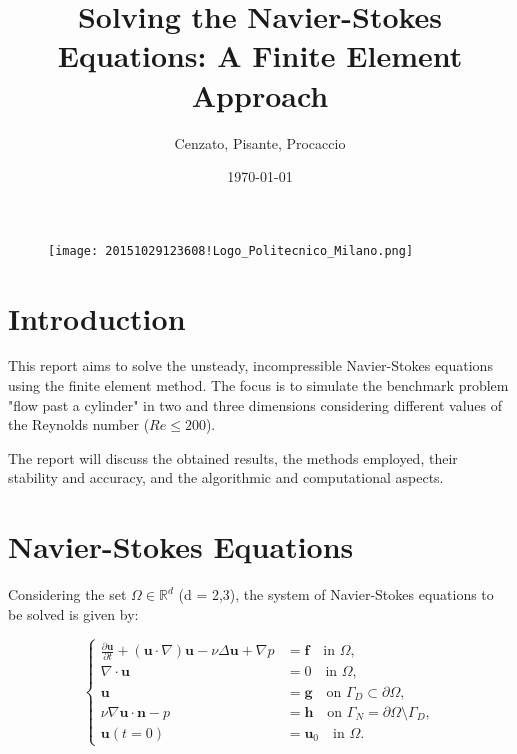 \documentclass{article}
\title{Solving the Navier-Stokes Equations: A Finite Element Approach}
\author{Cenzato, Pisante, Procaccio}
\date{\today}
\begin{document}
\maketitle

\begin{figure}
    \centering
    \texttt{[image: 20151029123608!Logo\_Politecnico\_Milano.png]}
    \label{fig:enter-label}
\end{figure}



\newpage
\tableofcontents


\section*{Introduction}

This report aims to solve the unsteady, incompressible Navier-Stokes equations using the finite element method. The focus is to simulate the benchmark problem "flow past a cylinder" in two and three dimensions considering different values of the Reynolds number (\(Re \leq 200\)).



The report will discuss the obtained results, the methods employed, their stability and accuracy, and the algorithmic and computational aspects.

\section*{Navier-Stokes Equations}

Considering the set $\Omega \in \mathbb{R}^d$ (d = 2,3), the system of Navier-Stokes equations to be solved is given by:

\begin{equation}
\begin{cases}
\frac{\partial \mathbf{u}}{\partial t} + (\mathbf{u} \cdot \nabla)\mathbf{u} - \nu \Delta \mathbf{u} + \nabla p &= \mathbf{f} \quad \text{in } \Omega , \\
\nabla \cdot \mathbf{u} &= 0 \quad \text{in } \Omega, \\
\mathbf{u} &= \mathbf{g} \quad \text{on } \Gamma_D \subset \partial \Omega, \\
\nu \nabla \mathbf{u} \cdot \mathbf{n} - p &= \mathbf{h} \quad \text{on } \Gamma_N = \partial \Omega \setminus \Gamma_D, \\
\mathbf{u}(t = 0) &= \mathbf{u}_0 \quad \text{in } \Omega.
\end{cases}
\end{equation}
\end{document}

